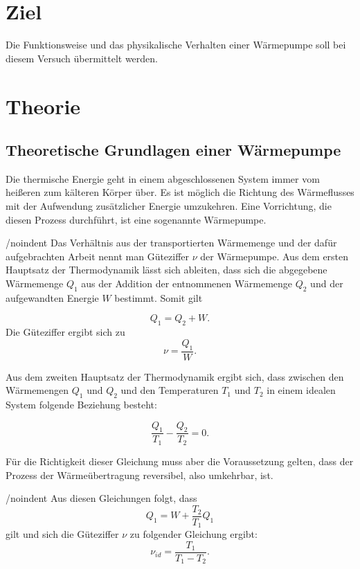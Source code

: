 \section{Ziel}
\label{sec:Ziel}

Die Funktionsweise und das physikalische Verhalten einer Wärmepumpe soll bei diesem Versuch übermittelt werden.

\section{Theorie}
\label{sec:Theorie}

\subsection{Theoretische Grundlagen einer Wärmepumpe}
Die thermische Energie geht in einem abgeschlossenen System immer vom heißeren zum kälteren Körper über. Es ist möglich die Richtung des Wärmeflusses mit der Aufwendung zusätzlicher Energie umzukehren. Eine Vorrichtung, die diesen Prozess durchführt, ist eine sogenannte Wärmepumpe. 

/noindent Das Verhältnis aus der transportierten Wärmemenge und der dafür aufgebrachten Arbeit nennt man Güteziffer $\nu$ der Wärmepumpe. Aus dem ersten Hauptsatz der Thermodynamik lässt sich ableiten, dass sich die abgegebene Wärmemenge $Q_1$ aus der Addition der entnommenen Wärmemenge $Q_2$ und der aufgewandten Energie $W$ bestimmt. Somit gilt

\begin{equation}
Q_1 = Q_2 + W.
\end{equation} 
Die Güteziffer ergibt sich zu 
\begin{equation}
\nu = \frac{Q_1}{W}.
\end{equation}

Aus dem zweiten Hauptsatz der Thermodynamik ergibt sich, dass zwischen den Wärmemengen $Q_1$ und $Q_2$ und den Temperaturen $T_1$ und $T_2$ in einem idealen System folgende Beziehung besteht: 

\begin{equation}
    \frac{Q_1}{T_1} - \frac{Q_2}{T_2} = 0.
\end{equation}

Für die Richtigkeit dieser Gleichung muss aber die Voraussetzung gelten, dass der Prozess der Wärmeübertragung reversibel, also umkehrbar, ist. 

/noindent Aus diesen Gleichungen folgt, dass 
\begin{equation}
    Q_1 = W+ \frac{T_2}{T_1} Q_1 
\end{equation}
gilt und sich die Güteziffer $\nu$ zu folgender Gleichung ergibt: 
\begin{equation}
    \nu_{id}= \frac{T_1}{T_1-T_2}.
\end{equation} 

